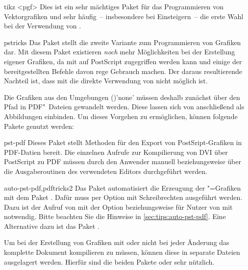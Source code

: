 \begin{packages}
\item[tikz]<pgf>
  Dies ist ein sehr mächtiges Paket für das Programmieren von Vektorgrafiken 
  und sehr häufig~-- insbesondere bei Einsteigern~-- die erste Wahl bei der 
  Verwendung von .
\item[pstricks]
  Das Paket  stellt die zweite Variante zum Programmieren 
  von Grafiken dar. Mit diesem Paket existieren \emph{noch} mehr Möglichkeiten 
  bei der Erstellung eigener Grafiken, da mit  auf PostScript 
  zugegriffen werden kann und einige der bereitgestellten Befehle davon rege 
  Gebrauch machen. Der daraus resultierende Nachteil ist, dass mit 
   die direkte Verwendung von  nicht 
  möglich ist.
  
  Die Grafiken aus den Umgebungen 
  ()'none' müssen deshalb zunächst
  über den Pfad 
  in PDF"~Dateien gewandelt werden. Diese lassen sich von  
  anschließend als Abbildungen einbinden. Um dieses Vorgehen zu ermöglichen, 
  können folgende Pakete genutzt werden:
  \begin{packages}
  \item[pst-pdf]
    Dieses Paket stellt Methoden für den Export von PostSript-Grafiken in 
    PDF-Datien bereit. Die einzelnen Aufrufe zur Kompilierung von DVI über 
    PostScript zu PDF müssen durch den Anwender manuell beziehungsweise über 
    die Ausgaberoutinen des verwendeten Editors durchgeführt werden.
  \item[auto-pst-pdf,pdftricks2]
    Das Paket automatisiert die Erzeugung der "=Grafiken mit 
    dem Paket . Dafür muss  per Option mit 
    Schreibrechten ausgeführt werden. Dazu ist der Aufruf von  
    mit der Option  beziehungsweise für Nutzer von 
     mit  notwendig. 
    Bitte beachten Sie die Hinweise in \autoref{sec:tips:auto-pst-pdf}. Eine 
    Alternative dazu ist das Paket .
  \end{packages}
\end{packages}
%
Um bei der Erstellung von Grafiken mit  oder  
nicht bei jeder Änderung das komplette Dokument kompilieren zu müssen, können 
diese in separate Dateien ausgelagert werden. Hierfür sind die beiden Pakete 
 oder  sehr nützlich.

